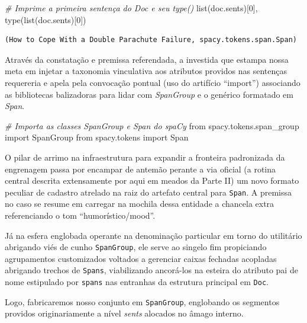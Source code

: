 \documentclass[
  brazilian,
]{article}
\newenvironment{Shaded}{}{}
\newcommand{\BuiltInTok}[1]{#1}
\newcommand{\CommentTok}[1]{\textcolor[rgb]{0.38,0.63,0.69}{\textit{#1}}}
\newcommand{\DecValTok}[1]{\textcolor[rgb]{0.25,0.63,0.44}{#1}}
\newcommand{\ImportTok}[1]{#1}
\newcommand{\NormalTok}[1]{#1}
\begin{document}
\begin{Shaded}
\begin{Highlighting}[]
\CommentTok{\# Imprime a primeira sentença do Doc e seu type()}
\BuiltInTok{list}\NormalTok{(doc.sents)[}\DecValTok{0}\NormalTok{], }\BuiltInTok{type}\NormalTok{(}\BuiltInTok{list}\NormalTok{(doc.sents)[}\DecValTok{0}\NormalTok{])}
\end{Highlighting}
\end{Shaded}

\begin{verbatim}
(How to Cope With a Double Parachute Failure, spacy.tokens.span.Span)
\end{verbatim}

Através da constatação e premissa referendada, a investida que estampa
nossa meta em injetar a taxonomia vinculativa aos atributos providos nas
sentenças requereria e apela pela convocação pontual (uso do artifício
``import'') associando as bibliotecas balizadoras para lidar com
\emph{SpanGroup} e o genérico formatado em \emph{Span}.

\begin{Shaded}
\begin{Highlighting}[]
\CommentTok{\# Importa as classes SpanGroup e Span do spaCy}
\ImportTok{from}\NormalTok{ spacy.tokens.span\_group }\ImportTok{import}\NormalTok{ SpanGroup}
\ImportTok{from}\NormalTok{ spacy.tokens }\ImportTok{import}\NormalTok{ Span}
\end{Highlighting}
\end{Shaded}

O pilar de arrimo na infraestrutura para expandir a fronteira
padronizada da engrenagem passa por encampar de antemão perante a via
oficial (a rotina central descrita extensamente por aqui em meados da
Parte II) um novo formato peculiar de cadastro atrelado na raiz do
artefato central para \texttt{Span}. A premissa no caso se resume em
carregar na mochila dessa entidade a chancela extra referenciando o tom
``humorístico/mood''.

Já na esfera englobada operante na denominação particular em torno do
utilitário abrigando viés de cunho \texttt{SpanGroup}, ele serve ao
singelo fim propiciando agrupamentos customizados voltados a gerenciar
caixas fechadas acopladas abrigando trechos de \texttt{Spans},
viabilizando ancorá-los na esteira do atributo pai de nome estipulado
por \texttt{spans} nas entranhas da estrutura principal em \texttt{Doc}.

Logo, fabricaremos nosso conjunto em \texttt{SpanGroup}, englobando os
segmentos providos originariamente a nível \emph{sents} alocados no
âmago interno.
\end{document}
